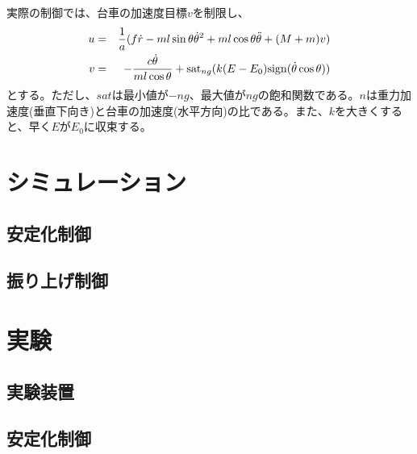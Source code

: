\documentclass[a4j,11pt,twoside]{ujbook}
\begin{document}
		実際の制御では、台車の加速度目標$v$を制限し、
		\begin{eqnarray}
			u &=& \frac{1}{a}(f\dot{r} - ml\sin\theta\dot{\theta}^{2} + ml\cos\theta\ddot{\theta} + (M + m)v)\\
			v &=& -\frac{c\dot{\theta}}{ml\cos\theta} + {\rm sat}_{ng}(k(E-E_{0}){\rm sign}(\dot\theta\cos\theta))
		\end{eqnarray}
		とする。ただし、$sat$は最小値が$-ng$、最大値が$ng$の飽和関数である。$n$は重力加速度(垂直下向き)と台車の加速度(水平方向)の比である。また、$k$を大きくすると、早く$E$が$E_{0}$に収束する。
		
\chapter{シミュレーション}
	\section{安定化制御}
	\section{振り上げ制御}

\chapter{実験}
	\section{実験装置}
	
	\section{安定化制御}
\end{document}
